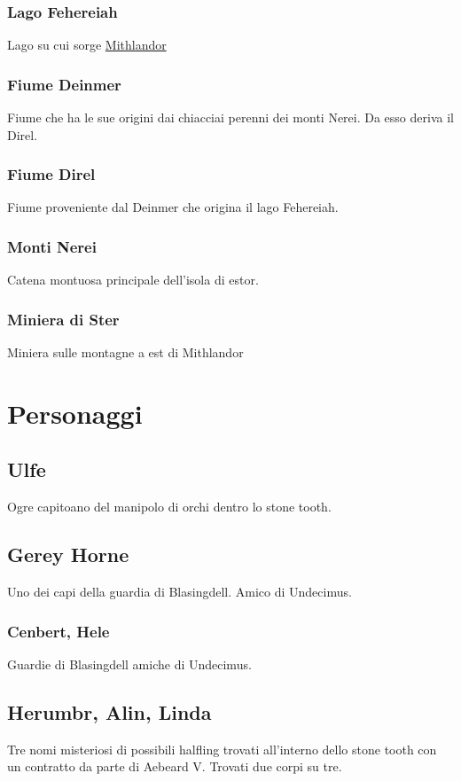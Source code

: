 \documentclass[10pt,twoside,twocolumn]{article}
\begin{document}
\subsubsection{Lago Fehereiah}\label{loc:fehereiah}
Lago su cui sorge \hyperref[loc:mithlandor]{Mithlandor}
\subsubsection{Fiume Deinmer}\label{loc:deinmer}
Fiume che ha le sue origini dai chiacciai perenni dei monti Nerei. Da esso
deriva il Direl.
\subsubsection{Fiume Direl}\label{loc:direl}
Fiume proveniente dal Deinmer che origina il lago Fehereiah.
\subsubsection{Monti Nerei}\label{loc:nerei}
Catena montuosa principale dell'isola di estor.
\subsubsection{Miniera di Ster}\label{loc:ster}
Miniera sulle montagne a est di Mithlandor
\section{Personaggi}
\subsection{Ulfe}\label{char:ulfe}
Ogre capitoano del manipolo di orchi dentro lo stone tooth.
\subsection{Gerey Horne}
Uno dei capi della guardia di Blasingdell. Amico di Undecimus.
\subsubsection{Cenbert, Hele}\label{char:cenbert}
Guardie di Blasingdell amiche di Undecimus.
\subsection{Herumbr, Alin, Linda}\label{char:herumbr}
Tre nomi misteriosi di possibili halfling trovati all'interno
dello stone tooth con un contratto da parte di Aebeard V.
Trovati due corpi su tre.
\end{document}
